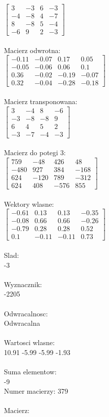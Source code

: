 \documentclass[a4paper,12pt]{article}
\begin{document}
$\begin{bmatrix} 3&-3&6&-3\\-4&-8&4&-7\\8&-8&5&-4\\-6&9&2&-3 \end{bmatrix}$
\\
\\
Macierz odwrotna:\\

$\begin{bmatrix} -0.11&-0.07&0.17&0.05\\-0.05&-0.06&0.06&0.1\\0.36&-0.02&-0.19&-0.07\\0.32&-0.04&-0.28&-0.18 \end{bmatrix}$
\\
\\
Macierz transponowana:\\

$\begin{bmatrix} 3&-4&8&-6\\-3&-8&-8&9\\6&4&5&2\\-3&-7&-4&-3 \end{bmatrix}$
\\
\\
Macierz do potegi 3:\\

$\begin{bmatrix} 759&-48&426&48\\-480&927&384&-168\\624&-120&789&-312\\624&408&-576&855 \end{bmatrix}$
\\
\\
Wektory wlasne:\\

$\begin{bmatrix} -0.61&0.13&0.13&-0.35\\-0.08&0.66&0.66&-0.26\\-0.79&0.28&0.28&0.52\\0.1&-0.11&-0.11&0.73 \end{bmatrix}$
\\
\\
Slad:\\
-3
\\
\\
Wyznacznik:\\
-2205
\\
\\
Odwracalnosc:\\
Odwracalna
\\
\\
Wartosci wlasne:\\
10.91 -5.99 -5.99 -1.93
\\
\\
Suma elementow:\\
-9
\\
\newpage
Numer macierzy:
379
\\
\\
Macierz:\\
\end{document}
